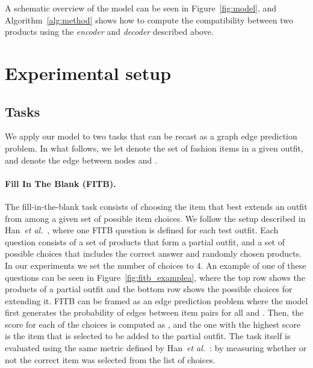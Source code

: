 \documentclass[10pt,twocolumn,letterpaper]{article}
\begin{document}
A schematic overview of the model can be seen in Figure~\ref{fig:model}, and Algorithm~\ref{alg:method} shows how to compute the compatibility between two products using the \emph{encoder} and \emph{decoder} described above.





\section{Experimental setup}
\label{sec:exp_setup}


\subsection{Tasks}
\label{ssec:tasks}
We apply our model to two tasks that can be recast as a graph edge prediction problem. In what follows, we let  denote the set of  fashion items in a given outfit, and  denote the edge between nodes  and .


\paragraph{Fill In The Blank (FITB).}
\label{sssec:fitb}
The fill-in-the-blank task consists of choosing the item that best extends an outfit from among a given set of possible item choices. We follow the setup described in Han~\emph{et al.}~\cite{han2017learning}, where one FITB question is defined for each test outfit. Each question consists of a set of products that form a partial outfit, and a set of possible choices   that includes the correct answer and  randomly chosen products. In our experiments we set the number of choices to 4. An example of one of these questions can be seen in Figure~\ref{fig:fitb_examplea}, where the top row shows the products of a partial outfit and the bottom row shows the possible choices for extending it. FITB can be framed as an edge prediction problem where the model first generates the probability of edges between item pairs  for all  and . Then, the score for each of the  choices is computed as , and the one with the highest score is the item that is selected to be added to the partial outfit. The task itself is evaluated using the same metric defined by Han~\emph{et al.}~\cite{han2017learning}: by measuring whether or not the correct item was selected from the list of choices.
\end{document}
